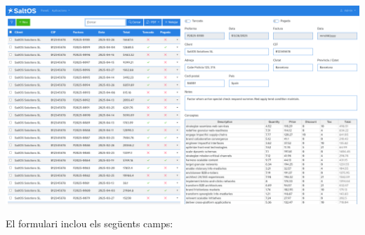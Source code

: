 \documentclass[a4paper]{article}
\begin{document}
\begin{center}\includegraphics[width=1\textwidth]{../ujest/snaps/test-screenshots-js-screenshots-sales-invoices-edit-100-ca-es-1-snap.png}\end{center}

El formulari inclou els següents camps:
\end{document}
